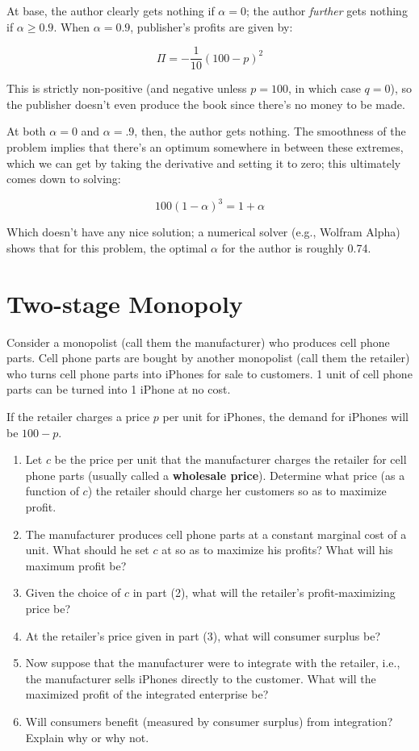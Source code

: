 \documentclass{article}
\newenvironment{solution}{\color{red}}{\color{black}}
\begin{document}
\begin{solution}
\begin{enumerate}
At base, the author clearly gets nothing if $\alpha = 0$; the author \emph{further} gets nothing if $\alpha \geq 0.9$. When $\alpha = 0.9$, publisher's profits are given by:

\[ \Pi = -\frac1{10} (100 - p)^2 \]

This is strictly non-positive (and negative unless $p = 100$, in which case $q = 0$), so the publisher doesn't even produce the book since there's no money to be made.

At both $\alpha = 0$ and $\alpha = .9$, then, the author gets nothing. The smoothness of the problem implies that there's an optimum somewhere in between these extremes, which we can get by taking the derivative and setting it to zero; this ultimately comes down to solving:

\[ 100(1-\alpha)^3 = 1 + \alpha \]

Which doesn't have any nice solution; a numerical solver (e.g., Wolfram Alpha) shows that for this problem, the optimal $\alpha$ for the author is roughly 0.74.
\end{enumerate}

\end{solution}

\section*{Two-stage Monopoly}
Consider a monopolist (call them the manufacturer) who produces cell phone parts. Cell phone parts are bought by another monopolist (call them the retailer) who turns cell phone parts into iPhones for sale to customers. 1 unit of cell phone parts can be turned into 1 iPhone at no cost.

If the retailer charges a price $p$ per unit for iPhones, the demand for iPhones will be $100 - p$. 
\begin{enumerate}
\item Let $c$ be the price per unit that the manufacturer charges the retailer for cell phone parts (usually called a \textbf{wholesale price}). Determine what price (as a function of $c$)  the retailer should charge her customers so as to maximize profit.
\item The manufacturer produces cell phone parts at a constant marginal cost of  a unit. What should he set $c$ at so as to maximize his profits? What will his maximum profit be?
\item Given the choice of $c$ in part (2), what will the retailer's profit-maximizing price be?
\item At the retailer's price given in part (3), what will consumer surplus be?
\item Now suppose that the manufacturer were to integrate with the retailer, i.e., the manufacturer sells iPhones directly to the customer. What will the maximized profit of the integrated enterprise be?
\item Will consumers benefit (measured by consumer surplus) from integration?  Explain why or why not.
\end{enumerate}
\end{document}
